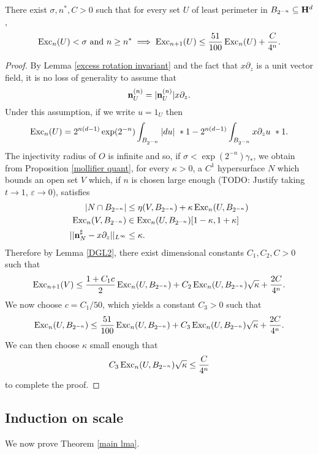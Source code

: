 \begin{proposition}\label{DGL 3}
There exist $\sigma, n^*, C > 0$ such that for every set $U$ of least perimeter in $B_{2^{-n}} \subseteq \mathbf H^d$,
$$\operatorname{Exc}_n(U) < \sigma \text{ and } n \geq n^* \implies \operatorname{Exc}_{n+1}(U) \leq \frac{51}{100} \operatorname{Exc}_n(U) + \frac{C}{4^n}.$$
\end{proposition}
\begin{proof}
By Lemma \ref{excess rotation invariant} and the fact that $x\partial_z$ is a unit vector field, it is no loss of generality to assume that
$$\mathbf n^{(n)}_U = |\mathbf n^{(n)}_U| x\partial_z.$$
Under this assumption, if we write $u = 1_U$ then
$$\operatorname{Exc}_n(U) = 2^{n(d - 1)} \exp(2^{-n}) \int_{B_{2^{-n}}} |du| ~*1 - 2^{n(d - 1)} \int_{B_{2^{-n}}} x\partial_z u ~*1.$$
The injectivity radius of $O$ is infinite and so, if $\sigma < \exp(2^{-n}) \gamma_*$, we obtain from Proposition \ref{mollifier quant}, for every $\kappa > 0$, a $C^1$ hypersurface $N$ which bounds an open set $V$ which, if $n$ is chosen large enough (TODO: Justify taking $t \to 1$, $\varepsilon \to 0$), satisfies
\begin{align*}
|N \cap B_{2^{-n}}| &\leq \eta(V, B_{2^{-n}}) + \kappa \operatorname{Exc}_n(U, B_{2^{-n}}) \\
\operatorname{Exc}_n(V, B_{2^{-n}}) &\in \operatorname{Exc}_n(U, B_{2^{-n}})[1 - \kappa, 1 + \kappa] \\
||\mathbf n^\sharp_N - x\partial_z||_{L^\infty} &\leq \kappa.
\end{align*}
Therefore by Lemma \ref{DGL2}, there exist dimensional constants $C_1,C_2,C > 0$ such that
$$\operatorname{Exc}_{n + 1}(V) \leq \frac{1 + C_1c}{2} \operatorname{Exc}_n(U, B_{2^{-n}}) + C_2 \operatorname{Exc}_n(U, B_{2^{-n}}) \sqrt \kappa + \frac{2C}{4^n}.$$
We now choose $c = C_1/50$, which yields a constant $C_3 > 0$ such that
$$\operatorname{Exc}_n(U, B_{2^{-n}}) \leq \frac{51}{100} \operatorname{Exc}_n(U, B_{2^{-n}}) + C_3 \operatorname{Exc}_n(U, B_{2^{-n}}) \sqrt \kappa + \frac{2C}{4^n}.$$
We can then choose $\kappa$ small enough that
$$C_3 \operatorname{Exc}_n(U, B_{2^{-n}}) \sqrt \kappa \leq \frac{C}{4^n}$$
to complete the proof.
\end{proof}


\subsection{Induction on scale}
We now prove Theorem \ref{main lma}.

